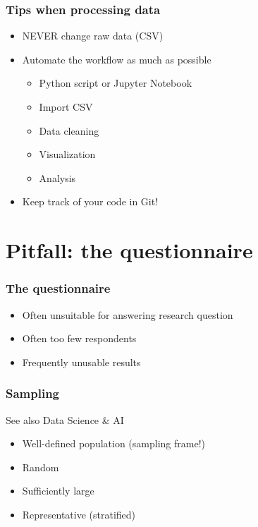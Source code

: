 \documentclass[aspectratio=169]{beamer}
\begin{document}
\begin{frame}
  \frametitle{Tips when processing data}
  \begin{itemize}
    \item NEVER change raw data (CSV)
    \item Automate the workflow as much as possible
          \begin{itemize}
            \item Python script or Jupyter Notebook
            \item Import CSV
            \item Data cleaning
            \item Visualization
            \item Analysis
          \end{itemize}
    \item Keep track of your code in Git!
  \end{itemize}


\end{frame}

\section{Pitfall: the questionnaire}

\begin{frame}
  \frametitle{The questionnaire}


  \bigskip

  \begin{itemize}
    \item Often unsuitable for answering research question
    \item Often too few respondents
    \item Frequently unusable results
  \end{itemize}

\end{frame}

\begin{frame}
  \frametitle{Sampling}

  See also Data Science \& AI

  \begin{itemize}
    \item Well-defined population (sampling frame!)
    \item Random
    \item Sufficiently large
    \item Representative (stratified)
  \end{itemize}

\end{frame}
\end{document}
